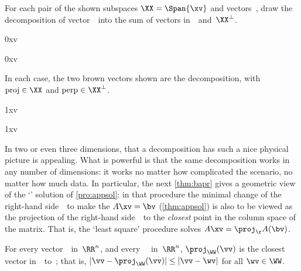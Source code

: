\begin{reduce}
\begin{example} 
For each pair of the shown subspaces \(\XX=\Span\{\xv\}\) and  vectors~\vv, draw the decomposition of vector~\vv\ into the sum of vectors in~\XX\ and~\(\XX^\perp\).
\begin{Parts}
\item {}0xv
\item {}0xv
\end{Parts}
\begin{solution} 
In each case, the two brown vectors shown are the decomposition, with \(\text{proj}\in\XX\) and \(\text{perp}\in\XX^\perp\).
\begin{Parts}
\item {}1xv
\item {}1xv
\end{Parts} 
\end{solution}
\end{example}

In two or even three dimensions, that a decomposition has such a nice physical picture is appealing.
What is powerful is that the same decomposition works in any number of dimensions: it works no matter how complicated the scenario, no matter how much data.
In particular, the next \cref{thm:bapr} gives a geometric view of the `' solution of \cref{pro:appsol}: 
in that procedure the minimal change of the right-hand side~\bv\ to make the  \(A\xv=\bv\)  (\cref{thm:appsol}) is also to be viewed as the projection of the right-hand side~\bv\ to the \emph{closest} point in the column space of the matrix.
That is, the `least square' procedure solves \(A\xv=\proj_\AA(\bv)\).

\begin{theorem} \label{thm:bapr}
For every vector~\vv\ in~\(\RR^n\), and every ~\WW\ in~\(\RR^n\),  \(\proj_\WW(\vv)\) is the closest vector in~\WW\ to~\vv; that is,  \(|\vv-\proj_\WW(\vv)|\leq|\vv-\wv|\) for all \(\wv\in\WW\).\end{theorem}


\end{reduce}
